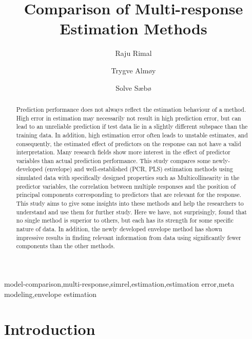 \documentclass[12pt,3p,authoryear]{elsarticle}
\begin{document}
\begin{frontmatter}

  \title{Comparison of Multi-response Estimation Methods}
  
    \author[KBM]{Raju Rimal}
    \author[KBM]{Trygve Almøy}
  
    \author[KBM]{Solve Sæbø}
  
      \address[KBM]{Faculty of Chemistry and Bioinformatics, Norwegian University of Life Sciences, Ås, Norway}
  
  \begin{abstract}
  Prediction performance does not always reflect the estimation behaviour of a method. High error in estimation may necessarily not result in high prediction error, but can lead to an unreliable prediction if test data lie in a slightly different subspace than the training data. In addition, high estimation error often leads to unstable estimates, and consequently, the estimated effect of predictors on the response can not have a valid interpretation. Many research fields show more interest in the effect of predictor variables than actual prediction performance. This study compares some newly-developed (envelope) and well-established (PCR, PLS) estimation methods using simulated data with specifically designed properties such as Multicollinearity in the predictor variables, the correlation between multiple responses and the position of principal components corresponding to predictors that are relevant for the response. This study aims to give some insights into these methods and help the researchers to understand and use them for further study. Here we have, not surprisingly, found that no single method is superior to others, but each has its strength for some specific nature of data. In addition, the newly developed envelope method has shown impressive results in finding relevant information from data using significantly fewer components than the other methods.
  \end{abstract}
   \begin{keyword} model-comparison,multi-response,simrel,estimation,estimation error,meta modeling,envelope estimation\end{keyword}

\end{frontmatter}

\hypertarget{introduction}{%
\section{Introduction}\label{introduction}}
\end{document}
